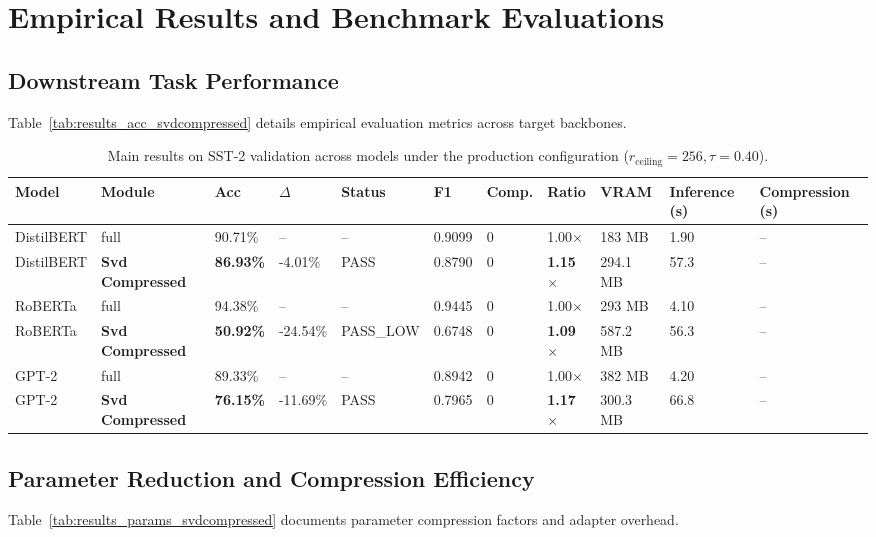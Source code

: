\section{Empirical Results and Benchmark Evaluations}

\subsection{Downstream Task Performance}
Table~\ref{tab:results_acc_svdcompressed} details empirical evaluation metrics across target backbones.

\begin{table}[t]
\centering
\small
\begin{tabular}{lllllllllll}
\toprule
\textbf{Model} & \textbf{Module} & \textbf{Acc} & \textbf{$\Delta$} & \textbf{Status} & \textbf{F1} & \textbf{Comp.} & \textbf{Ratio} & \textbf{VRAM} & \textbf{Inference (s)} & \textbf{Compression (s)} \\
\midrule
DistilBERT & full & 90.71\% & -- & -- & 0.9099 & 0 & 1.00$\times$ & 183 MB & 1.90 & -- \\
DistilBERT & \textbf{Svd Compressed} & \textbf{86.93\%} & -4.01\% & PASS & 0.8790 & 0 & \textbf{1.15$\times$} & 294.1 MB & 57.3 & -- \\
RoBERTa & full & 94.38\% & -- & -- & 0.9445 & 0 & 1.00$\times$ & 293 MB & 4.10 & -- \\
RoBERTa & \textbf{Svd Compressed} & \textbf{50.92\%} & -24.54\% & PASS_LOW & 0.6748 & 0 & \textbf{1.09$\times$} & 587.2 MB & 56.3 & -- \\
GPT-2 & full & 89.33\% & -- & -- & 0.8942 & 0 & 1.00$\times$ & 382 MB & 4.20 & -- \\
GPT-2 & \textbf{Svd Compressed} & \textbf{76.15\%} & -11.69\% & PASS & 0.7965 & 0 & \textbf{1.17$\times$} & 300.3 MB & 66.8 & -- \\
\bottomrule
\end{tabular}
\caption{Main results on SST-2 validation across models under the production configuration ($r_{\mathrm{ceiling}}=256, \tau=0.40$).}
\label{tab:main_sst2}
\end{table}

\subsection{Parameter Reduction and Compression Efficiency}
Table~\ref{tab:results_params_svdcompressed} documents parameter compression factors and adapter overhead.

